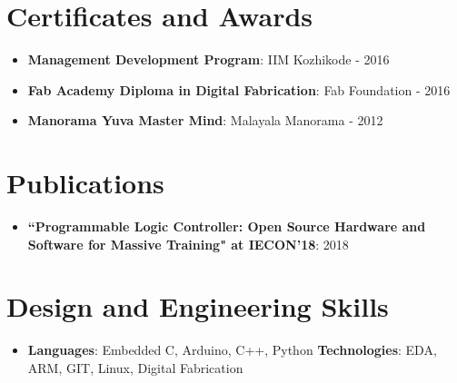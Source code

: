 \documentclass[a4paper,10pt]{article}
\newcommand{\resumeItem}[2]{
  \item\small{
    \textbf{#1}{: #2 \vspace{-2pt}}
  }
}
\newcommand{\resumeSubItem}[2]{\resumeItem{#1}{#2}\vspace{-4pt}}
\newcommand{\resumeSubHeadingListStart}{\begin{itemize}[leftmargin=*]}
\newcommand{\resumeSubHeadingListEnd}{\end{itemize}}
\begin{document}
\section{Certificates and Awards}
  \resumeSubHeadingListStart
    \resumeSubItem{Management Development Program}{IIM Kozhikode - 2016}
    \resumeSubItem{Fab Academy Diploma in Digital Fabrication}{Fab Foundation - 2016}
    \resumeSubItem{Manorama Yuva Master Mind}{Malayala Manorama - 2012}
  \resumeSubHeadingListEnd

\section{Publications}
  \resumeSubHeadingListStart
    \resumeSubItem{``Programmable Logic Controller: Open Source
Hardware and Software for Massive Training" at IECON'18}{2018}
  \resumeSubHeadingListEnd


\section{Design and Engineering Skills}
 \resumeSubHeadingListStart
   \item{
     \textbf{Languages}{: Embedded C, Arduino, C++, Python}
     \hfill
     \textbf{Technologies}{: EDA, ARM, GIT, Linux, Digital Fabrication}
   }
 \resumeSubHeadingListEnd


\end{document}

